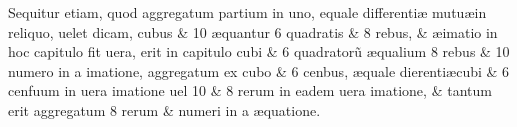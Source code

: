 Sequitur etiam, quod aggregatum partium in uno, e\ft {\ae}quale differenti{\ae} mutu\ae in reliquo, uelet \jfi dicam, cubus \& 10 {\ae}quantur 6 quadratis \& 8 rebus, \& {\ae\ft}imatio in hoc capitulo fit uera, erit in capitulo cubi \& 6 quadrator\~{u} {\ae}qualium 8 rebus \& 10 numero in {\jfi\ct}a {\aeft}imatione, aggregatum ex cubo \& 6 cen{\jfi}bus, {\ae}quale di{\ff}erenti\ae cubi \& 6 cenfuum in uera {\aeft}imatione uel 10 \& 8 rerum in eadem uera {\aeft}imatione, \& tantum erit aggregatum 8 rerum \& numeri in {\jfi\ct}a {\ae}quatione.
